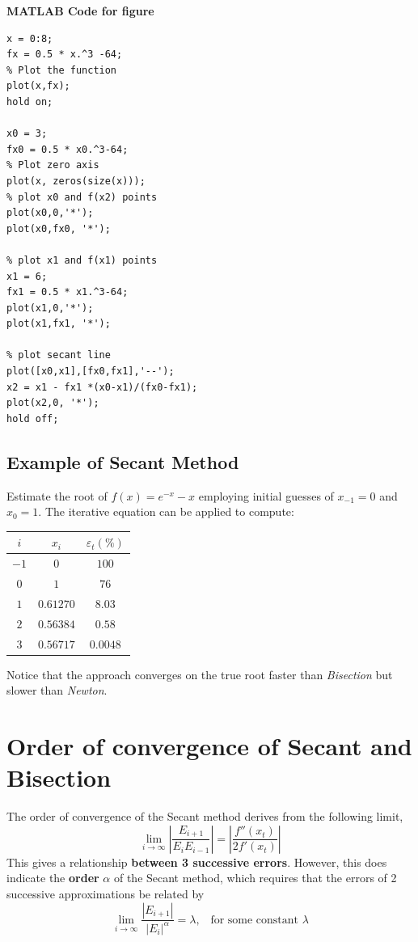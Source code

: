 \documentclass [titlepage,12pt,letter] {article}
\begin{document}
\noindent
{\bf MATLAB Code for figure } \\ 
\begin{verbatim} 
x = 0:8;
fx = 0.5 * x.^3 -64;
% Plot the function 
plot(x,fx);
hold on;

x0 = 3;
fx0 = 0.5 * x0.^3-64;
% Plot zero axis 
plot(x, zeros(size(x)));
% plot x0 and f(x2) points
plot(x0,0,'*');
plot(x0,fx0, '*');

% plot x1 and f(x1) points
x1 = 6;
fx1 = 0.5 * x1.^3-64;
plot(x1,0,'*');
plot(x1,fx1, '*');

% plot secant line 
plot([x0,x1],[fx0,fx1],'--');
x2 = x1 - fx1 *(x0-x1)/(fx0-fx1);
plot(x2,0, '*');
hold off;
\end{verbatim} 

\subsection{Example of Secant Method} 

Estimate the root of $f(x) = e^{-x} -x$ employing initial guesses of
$x_{-1} = 0$ and $x_0 = 1$. The iterative equation can be applied to compute: 

\begin{table}[h]
\begin{tabular}{c|c|c} 
$i$ & $x_i$ & $\varepsilon_t(\%)$ \\ 
\hline 
$-1$ & $0$ & $100$ \\
$0$ & $1$ & $76$ \\ 
$1$ & $0.61270$ & $8.03$ \\
$2$ & $0.56384$ & $0.58$ \\ 
$3$ & $0.56717$ & $0.0048$ \\  
\hline
\end{tabular} 
\end{table} 
\noindent 
Notice that the approach converges on the true root faster than 
{\it Bisection} but slower than {\it Newton}.  

\section{Order of convergence of Secant and Bisection} 

The order of convergence of the Secant method derives from the following limit, 
\begin{equation} 
\lim_{i \rightarrow \infty} \left| \frac{E_{i+1}}{E_iE_{i-1}}\right| = \left| \frac{f''(x_t)}{2f'(x_t)} \right|
\end{equation} 
\noindent 
This gives a relationship {\bf between 3 successive errors}. 
However, this does indicate the {\bf order} $\alpha$ of the Secant method, which requires that the errors of 2 successive approximations be related by 
\begin{equation} 
\lim_{i \rightarrow \infty} \frac{|E_{i+1}|}{|E_i|^{\alpha}} = \lambda, \;\;\; \mbox{for some constant } \lambda 
\end{equation} 
\end{document}
